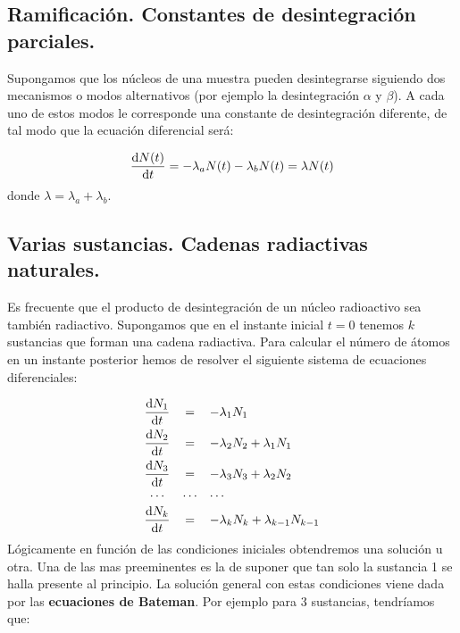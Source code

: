 \subsection{Ramificación. Constantes de desintegración parciales.}

Supongamos que los núcleos de una muestra pueden desintegrarse siguiendo dos mecanismos o modos alternativos (por ejemplo la desintegración $\alpha$ y $\beta$). A cada uno de estos modos le corresponde una constante de desintegración diferente, de tal modo que la ecuación diferencial será:

\begin{eqnarray}
	\frac{\mathrm{d} N(t)}{\mathrm{d} t} = - \lambda_a N(t) - \lambda_b N(t) = \lambda N(t)
\end{eqnarray}
donde $\lambda = \lambda_a + \lambda_b$. 

\subsection{Varias sustancias. Cadenas radiactivas naturales.}

Es frecuente que el producto de desintegración de un núcleo radioactivo sea también radiactivo. Supongamos que en el instante inicial $t=0$ tenemos $k$ sustancias que forman una cadena radiactiva. Para calcular el número de átomos en un instante posterior hemos de resolver el siguiente sistema de ecuaciones diferenciales:

\begin{equation}
	\begin{array}{ccl}
		\dfrac{\D N_1}{\D t} & = & - \lambda_1 N_1 \vspace{1.5mm} \\ \vspace{1.5mm}
		\dfrac{\D N_2}{\D t} & = & - \lambda_2 N_2 + \lambda_1 N_1 \\
		\dfrac{\D N_3}{\D t} & = & - \lambda_3 N_3 + \lambda_2 N_2\\\vspace{1.5mm}
					\ldots & \ldots &  \ldots \\					 
		\dfrac{\D N_k}{\D t} & = & - \lambda_k N_k  + \lambda_{k-1} N_{k-1}
	\end{array}
\end{equation}
Lógicamente en función de las condiciones iniciales obtendremos una solución u otra. Una de las mas preeminentes es la de suponer que tan solo la sustancia 1 se halla presente al principio. La solución general con estas condiciones viene dada por las \textbf{ecuaciones de Bateman}. Por ejemplo para 3 sustancias, tendríamos que:


